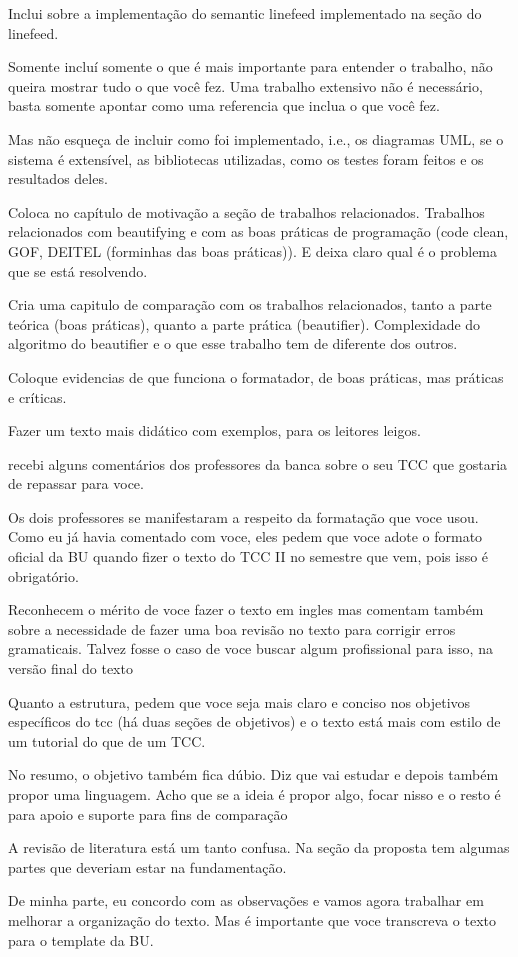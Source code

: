 Inclui sobre a implementação  do semantic linefeed implementado na seção do
linefeed.

Somente incluí somente o que é mais importante para entender o trabalho, não
queira mostrar tudo o que você fez. Uma trabalho extensivo não é necessário,
basta somente apontar como uma referencia que inclua o que você fez.

Mas não esqueça de incluir como foi implementado, i.e., os diagramas UML, se
o sistema é extensível, as bibliotecas utilizadas, como os testes foram
feitos e os resultados deles.

Coloca no capítulo de motivação a seção de trabalhos relacionados. Trabalhos
relacionados com beautifying e com as boas práticas de programação (code clean,
GOF, DEITEL (forminhas das boas práticas)). E deixa claro qual é o problema
que se está resolvendo.

Cria uma capitulo de comparação com os trabalhos relacionados, tanto a parte
teórica (boas práticas), quanto a parte prática (beautifier). Complexidade do
algoritmo do beautifier e o que esse trabalho tem de diferente dos outros.

Coloque evidencias de que funciona o formatador, de boas práticas, mas
práticas e críticas.

Fazer um texto mais didático com exemplos, para os leitores leigos.


recebi alguns comentários dos professores da banca sobre o seu TCC que
gostaria de repassar para voce.

Os dois professores se manifestaram a respeito da formatação que voce
usou. Como eu já havia comentado com voce, eles pedem que voce adote o
formato oficial da BU quando fizer o texto do TCC II no semestre que
vem, pois isso é obrigatório.

Reconhecem o mérito de voce fazer o texto em ingles mas comentam
também sobre a necessidade de fazer uma boa revisão no texto para
corrigir erros gramaticais. Talvez fosse o caso de voce buscar algum
profissional para isso, na versão final do texto

Quanto a estrutura, pedem que voce seja mais claro e conciso nos
objetivos específicos do tcc (há duas seções de objetivos) e o texto
está mais com estilo de um tutorial do que de um TCC.

No resumo, o objetivo também fica dúbio. Diz que vai estudar e depois
também propor uma linguagem. Acho que se a ideia é propor algo, focar
nisso e o resto é para apoio e suporte para fins de comparação

A revisão de literatura está um tanto confusa. Na seção da proposta
tem algumas partes que deveriam estar na fundamentação.

De minha parte, eu concordo com as observações e vamos agora trabalhar
em melhorar a organização do texto. Mas é importante que voce
transcreva o texto para o template da BU.



